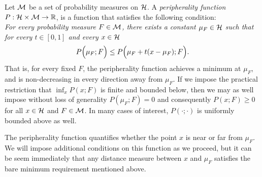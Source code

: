 Let ${\cal{M}}$ be a set of probability measures on ${\cal{H}}$. 
A {\it peripherality function} 
$ P : {\cal{H}} \times {\cal{M}} \rightarrow {\mathbb{R}}$,  is a function that satisfies the following 
condition:\\
{\it For every probability measure $F \in {\cal{M}}$, there exists a constant $\mu_{F} \in {\cal{H}}$ 
such that for every $t \in [ 0, 1]$ and every $x \in {\cal{H}}$}
\begin{align*} 
P \Bigl( \mu_{F} ; F \Bigr) \leq P \Bigl( \mu_{F} + t ( x - \mu_{F} ); F \Bigr). 
\end{align*} 
%
That is, for every fixed $F$, the peripherality function achieves a minimum at $\mu_{F}$, and is non-decreasing in every direction away from $\mu_{F}$. If we impose the practical restriction that $\inf_{x} P ( x ; F )$ is finite and bounded below, then we may as well impose without loss of generality $P ( \mu_{F} ; F ) = 0$ and consequently $P ( x ; F ) \geq 0$ for all $x \in {\cal{H}}$ and  $F \in {\cal{M}}$. In many cases of interest, $P ( \cdot; \cdot)$ is uniformly bounded above as well.

The peripherality function quantifies whether the point $x$ is near or far from $\mu_{F}$. 
We will impose additional conditions on this function as we proceed, but it can be seem immediately that any distance measure between $x$ and $\mu_{F}$ satisfies the bare minimum requirement mentioned above.

